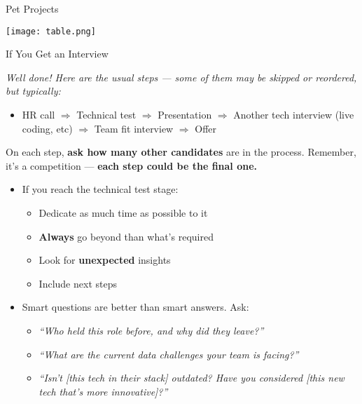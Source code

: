 \documentclass[10pt,a4paper]{article}
\begin{document}
\begin{multicols}{3}
\begin{textboxRed}{Pet Projects}
\end{textboxRed}

\begin{textboxWhite}{}
	\texttt{[image: table.png]}
\end{textboxWhite}

\begin{textboxGreen}{If You Get an Interview}

\textit{Well done! Here are the usual steps — some of them may be skipped or reordered, but typically:}

\begin{itemize}
    \item HR call $\Rightarrow$ Technical test $\Rightarrow$ Presentation $\Rightarrow$ Another tech interview (live coding, etc) $\Rightarrow$ Team fit interview $\Rightarrow$ Offer
  \end{itemize}

On each step, \textbf{ask how many other candidates} are in the process. Remember, it’s a competition — \textbf{each step could be the final one.}
\begin{itemize}    
\item If you reach the technical test stage:
  \begin{itemize}
    \item  Dedicate as much time as possible to it
    \item \textbf{Always} go beyond than what’s required
    \item Look for \textbf{unexpected} insights 
    \item Include next steps
  \end{itemize}
  \item Smart questions are better than smart answers. Ask:
  \begin{itemize}
    \item \textit{“Who held this role before, and why did they leave?”}
    \item \textit{“What are the current data challenges your team is facing?”}
    \item \textit{“Isn’t [this tech in their stack] outdated? Have you considered [this new tech that’s more innovative]?”}
  \end{itemize}
\end{itemize}

\end{textboxGreen}


\end{multicols}
\end{document}
